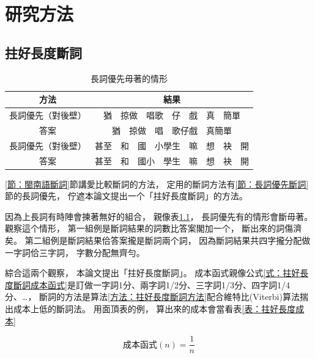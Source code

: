 \chapter{研究方法}
\label{章：研究方法}

\section{拄好長度斷詞}
\label{節：拄好長度斷詞}

\begin{table}
\caption{長詞優先毋著的情形}
\label{表：長詞優先佇一寡例有問題}
\centering
\begin{tabular}{c|c}
方法 & 結果\\
\hline
長詞優先（對後壁） & 猶　掠做　唱歌　仔　戲　真　簡單\\
答案 & 猶　掠做　唱　歌仔戲　真簡單\\
\hline
長詞優先（對後壁） & 甚至　和　國　小學生　嘛　想　袂　開\\
答案 & 甚至　和　國小　學生　嘛　想　袂　開\\
\end{tabular}
\end{table}

\ref{節：閩南語斷詞}節講愛比較斷詞的方法，
定用的斷詞方法有\ref{節：長詞優先斷詞}節的長詞優先，
佇遮本論文提出一个「拄好長度斷詞」的方法。


因為上長詞有時陣會揀著無好的組合，
親像表\ref{表：長詞優先佇一寡例有問題}，
長詞優先有的情形會斷毋著。
觀察這个情形，
第一組例是斷詞結果的詞數比答案閣加一个，
斷出來的詞傷濟矣。
第二組例是斷詞結果佮答案攏是斷詞兩个詞，
因為斷詞結果共四字攏分配做一字詞佮三字詞，
字數分配無齊勻。

綜合這兩个觀察，
本論文提出「拄好長度斷詞」。
成本函式親像公式\ref{式：拄好長度斷詞成本函式}是訂做一字詞1分、兩字詞1/2分、三字詞1/3分、四字詞1/4分、…，
斷詞的方法是算法\ref{方法：拄好長度斷詞方法}配合維特比(Viterbi)算法揣出成本上低的斷詞法。
用面頂表的例，
算出來的成本會當看表\ref{表：拄好長度成本}

\begin{equation}
\label{式：拄好長度斷詞成本函式}
成本函式(n) = \frac{1}{n}
\end{equation}

